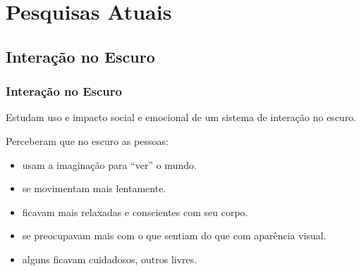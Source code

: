 \documentclass[brazil]{beamer}
\begin{document}
\section{Pesquisas Atuais}

\subsection{Interação no Escuro}
\begin{frame}
  \frametitle{Interação no Escuro}
  \vspace{-10pt}
  Estudam uso e impacto social e emocional de um sistema de interação no escuro.
  
  \vspace{10pt}
  \pause
  Perceberam que no escuro as pessoas:
  \begin{itemize}
    \item usam a imaginação para ``ver'' o mundo.
    \vspace{10pt}
    \item se movimentam mais lentamente.
    \vspace{10pt}
    \item ficavam mais relaxadas e conscientes com seu corpo.
    \vspace{10pt}
    \item se preocupavam mais com o que sentiam do que com aparência visual.
    \vspace{10pt}
    \item alguns ficavam cuidadosos, outros livres.
  \end{itemize}
\end{frame}

\end{document}
